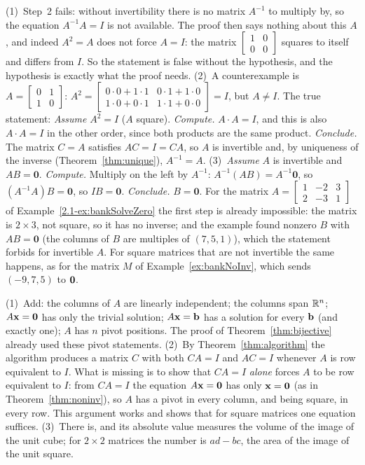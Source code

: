 \documentclass[11pt]{article}
\begin{document}
\begin{description}[leftmargin=0pt,itemsep=5pt]
    \item[Pause and think \ref{think:habits}.] (1)~Step~2 fails: without invertibility there is no matrix $A^{-1}$ to multiply by, so the equation $A^{-1}A=I$ is not available. The proof then says nothing about this $A$, and indeed $A^2=A$ does not force $A=I$: the matrix $\begin{bmatrix}1&0\\0&0\end{bmatrix}$ squares to itself and differs from $I$. So the statement is false without the hypothesis, and the hypothesis is exactly what the proof needs. (2)~A counterexample is $A=\begin{bmatrix}0&1\\1&0\end{bmatrix}$: $A^2=\begin{bmatrix}0\cdot0+1\cdot1&0\cdot1+1\cdot0\\1\cdot0+0\cdot1&1\cdot1+0\cdot0\end{bmatrix}=I$, but $A\neq I$. The true statement: \emph{Assume} $A^2=I$ ($A$ square). \emph{Compute.} $A\cdot A=I$, and this is also $A\cdot A=I$ in the other order, since both products are the same product. \emph{Conclude.} The matrix $C=A$ satisfies $AC=I=CA$, so $A$ is invertible and, by uniqueness of the inverse (Theorem~\ref{thm:unique}), $A^{-1}=A$. (3)~\emph{Assume} $A$ is invertible and $AB=\mathbf{0}$. \emph{Compute.} Multiply on the left by $A^{-1}$: $A^{-1}(AB)=A^{-1}\mathbf{0}$, so $(A^{-1}A)B=\mathbf{0}$, so $IB=\mathbf{0}$. \emph{Conclude.} $B=\mathbf{0}$. For the matrix $A=\begin{bmatrix}1&-2&3\\2&-3&1\end{bmatrix}$ of Example~\ref{2.1-ex:bankSolveZero} the first step is already impossible: the matrix is $2\times3$, not square, so it has no inverse; and the example found nonzero $B$ with $AB=\mathbf{0}$ (the columns of $B$ are multiples of $(7,5,1)$), which the statement forbids for invertible $A$. For square matrices that are not invertible the same happens, as for the matrix $M$ of Example~\ref{ex:bankNoInv}, which sends $(-9,7,5)$ to $\mathbf{0}$.
\item[Before the next section.] (1)~Add: the columns of $A$ are linearly independent; the columns span $\mathbb{R}^n$; $A\mathbf{x}=\mathbf{0}$ has only the trivial solution; $A\mathbf{x}=\mathbf{b}$ has a solution for every $\mathbf{b}$ (and exactly one); $A$ has $n$ pivot positions. The proof of Theorem~\ref{thm:bijective} already used these pivot statements. (2)~By Theorem~\ref{thm:algorithm} the algorithm produces a matrix $C$ with both $CA=I$ and $AC=I$ whenever $A$ is row equivalent to $I$. What is missing is to show that $CA=I$ \emph{alone} forces $A$ to be row equivalent to $I$: from $CA=I$ the equation $A\mathbf{x}=\mathbf{0}$ has only $\mathbf{x}=\mathbf{0}$ (as in Theorem~\ref{thm:noninv}), so $A$ has a pivot in every column, and being square, in every row. This argument works and shows that for square matrices one equation suffices. (3)~There is, and its absolute value measures the volume of the image of the unit cube; for $2\times2$ matrices the number is $ad-bc$, the area of the image of the unit square.
\end{description}
\end{document}
